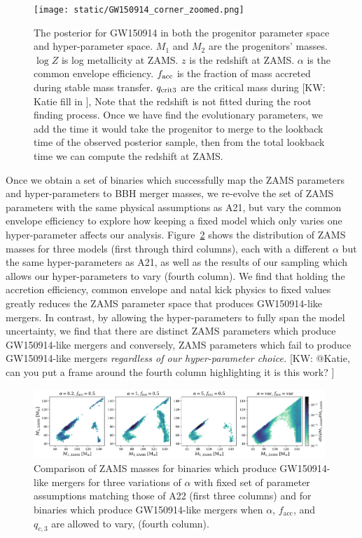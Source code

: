 \documentclass[twocolumn]{aastex631}
\newcommand{\kw}[1]{{\color{rb4}[KW: #1 ]}}
\begin{document}
\begin{figure}[h]
    \texttt{[image: static/GW150914\_corner\_zoomed.png]}
    \caption{The posterior for GW150914 in both the progenitor parameter space and hyper-parameter space.
    $M_1$ and $M_2$ are the progenitors' masses. $\log{Z}$ is log metallicity at ZAMS.
    $z$ is the redshift at ZAMS. 
    $\alpha$ is the common envelope efficiency.
    $f_{\rm acc}$ is the fraction of mass accreted during stable mass transfer.
    $q_{\rm crit 3}$ are the critical mass during \kw{Katie fill in},
    Note that the redshift is not fitted during the root finding process.
    Once we have find the evolutionary parameters, we add the time it would take the progenitor 
    to merge to the lookback time of the observed posterior sample,
    then from the total lookback time we can compute the redshift at ZAMS.
    }
    \label{fig:GW150914_posterior}
\end{figure}

Once we obtain a set of binaries which successfully map the ZAMS parameters and hyper-parameters to BBH merger masses, 
we re-evolve the set of ZAMS parameters with the same physical assumptions as A21, but vary the common envelope efficiency 
to explore how keeping a fixed model which only varies one hyper-parameter affects our analysis. 
Figure~\ref{fig:compare_fixed_variable} shows the distribution of ZAMS masses for three models (first through third columns), 
each with a different $\alpha$ but the same hyper-parameters as A21, 
as well as the results of our sampling which allows our hyper-parameters to vary (fourth column). We find that holding the accretion 
efficiency, common envelope and natal kick physics to fixed values greatly reduces the ZAMS parameter space 
that produces GW150914-like mergers. In contrast, by allowing the hyper-parameters to fully span the model uncertainty, we 
find that there are distinct ZAMS parameters which produce GW150914-like mergers and conversely, ZAMS parameters which 
fail to produce GW150914-like mergers \emph{regardless of our hyper-parameter choice.}
\kw{@Katie, can you put a frame around the fourth column highlighting it is this work?}



\begin{figure}
    \includegraphics[width=0.98\textwidth]{static/compare_fixed_variable.png}
    \caption{Comparison of ZAMS masses for binaries which produce GW150914-like mergers for three variations of $\alpha$
     with fixed set of parameter assumptions matching those of A22 (first three columns) and for binaries which produce 
     GW150914-like mergers when $\alpha$, $f_{\mathrm{acc}}$, and $q_{c,3}$ are allowed to vary, (fourth column).}
    \label{fig:compare_fixed_variable}
\end{figure}
\end{document}
